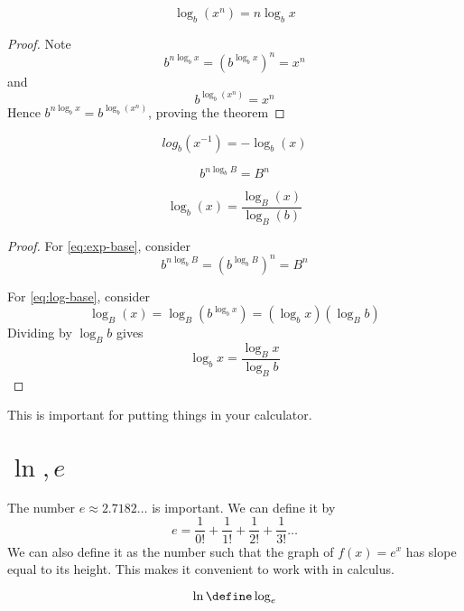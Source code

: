\documentclass[10pt]{scrartcl}
\begin{document}
\begin{theorem}
  \begin{equation}
    \label{eq:log-pow}
    \log_b(x^n)=n\log_b x
  \end{equation}
\end{theorem}
\begin{proof}
  Note
  \[
  b^{n\log_b x} = (b^{\log_b x})^n = x^n
  \]
  and 
  \[
  b^{\log_b(x^n)}=x^n
  \]
  Hence $b^{n\log_b x}=b^{\log_b(x^n)}$, proving the theorem
\end{proof}
\begin{cor}
  \[
  log_b(x^{-1})=-\log_b(x)
  \]
\end{cor}

\begin{theorem}
  \begin{equation}
    \label{eq:exp-base}
    b^{n\log_b B}=B^n
  \end{equation}

  \begin{equation}
    \log_b(x)= \frac{\log_B(x)}{\log_B(b)}
    \label{eq:log-base}
  \end{equation}
\end{theorem}
\begin{proof}
  For \cref{eq:exp-base}, consider
  \[
  b^{n\log_b B} = \left(b^{\log_b B} \right)^n= B^n
  \]
  
  For \cref{eq:log-base}, consider
  \[
  \log_B(x)=\log_B\left(b^{\log_b x}\right)=(\log_b x)(\log_B b)
  \]
  Dividing by $\log_B b$ gives 
  \[
  \log_bx = \frac{\log_B x}{\log_B b}
  \]
\end{proof}
This is important for putting things in your calculator. 

\section{$\ln,e$}
\begin{defn}[$e$]
  The number $e\approx 2.7182\dots$ is important.  We can define it by
  \[
  e=\frac{1}{0!}+\frac{1}{1!}+\frac{1}{2!}+\frac{1}{3!}\dots
  \]
  We can also define it as the number such that the graph
  of $f(x)=e^x$ has slope equal to its
  height. This makes it convenient to work with in calculus. 
\end{defn}

\begin{defn}[$\ln$]
  \[\ln\define \log_e\]
\end{defn}
\end{document}
